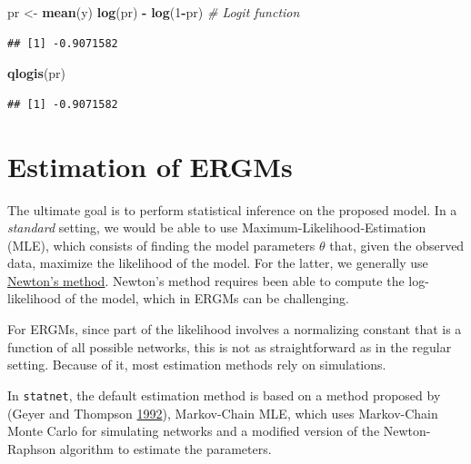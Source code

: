 \documentclass[]{book}
\newenvironment{Shaded}{\begin{snugshade}}{\end{snugshade}}
\newcommand{\CommentTok}[1]{\textcolor[rgb]{0.56,0.35,0.01}{\textit{#1}}}
\newcommand{\DecValTok}[1]{\textcolor[rgb]{0.00,0.00,0.81}{#1}}
\newcommand{\KeywordTok}[1]{\textcolor[rgb]{0.13,0.29,0.53}{\textbf{#1}}}
\newcommand{\NormalTok}[1]{#1}
\newcommand{\OperatorTok}[1]{\textcolor[rgb]{0.81,0.36,0.00}{\textbf{#1}}}
\newcommand{\StringTok}[1]{\textcolor[rgb]{0.31,0.60,0.02}{#1}}
\begin{document}
\begin{Shaded}
\begin{Highlighting}[]
\NormalTok{pr <-}\StringTok{ }\KeywordTok{mean}\NormalTok{(y)}
\KeywordTok{log}\NormalTok{(pr) }\OperatorTok{-}\StringTok{ }\KeywordTok{log}\NormalTok{(}\DecValTok{1}\OperatorTok{-}\NormalTok{pr) }\CommentTok{# Logit function}
\end{Highlighting}
\end{Shaded}

\begin{verbatim}
## [1] -0.9071582
\end{verbatim}

\begin{Shaded}
\begin{Highlighting}[]
\KeywordTok{qlogis}\NormalTok{(pr)}
\end{Highlighting}
\end{Shaded}

\begin{verbatim}
## [1] -0.9071582
\end{verbatim}

\hypertarget{estimation-of-ergms}{%
\section{Estimation of ERGMs}\label{estimation-of-ergms}}

The ultimate goal is to perform statistical inference on the proposed model. In a \emph{standard} setting, we would be able to use Maximum-Likelihood-Estimation (MLE), which consists of finding the model parameters \(\theta\) that, given the observed data, maximize the likelihood of the model. For the latter, we generally use \href{https://en.wikipedia.org/wiki/Newton\%27s_method_in_optimization}{Newton's method}. Newton's method requires been able to compute the log-likelihood of the model, which in ERGMs can be challenging.

For ERGMs, since part of the likelihood involves a normalizing constant that is a function of all possible networks, this is not as straightforward as in the regular setting. Because of it, most estimation methods rely on simulations.

In \texttt{statnet}, the default estimation method is based on a method proposed by (Geyer and Thompson \protect\hyperlink{ref-Geyer1992}{1992}), Markov-Chain MLE, which uses Markov-Chain Monte Carlo for simulating networks and a modified version of the Newton-Raphson algorithm to estimate the parameters.
\end{document}
